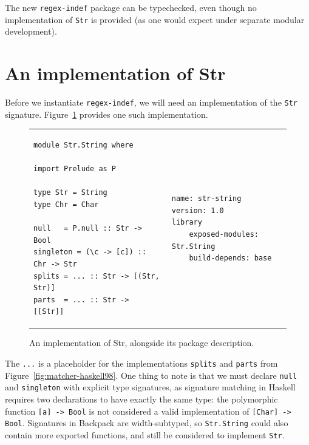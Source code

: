 The new \verb|regex-indef| package can be typechecked, even though no
implementation of \verb|Str| is provided (as one would expect under
separate modular development).

\section{An implementation of Str}

Before we instantiate \verb|regex-indef|, we will need an implementation
of the \verb|Str| signature.  Figure~\ref{fig:matcher-str-string-source}
provides one such implementation.

\begin{figure}
\begin{tabular}{p{} p{}}
\begin{verbatim}
module Str.String where

import Prelude as P

type Str = String
type Chr = Char

null   = P.null :: Str -> Bool
singleton = (\c -> [c]) :: Chr -> Str
splits = ... :: Str -> [(Str, Str)]
parts  = ... :: Str -> [[Str]]
\end{verbatim}
&
\begin{verbatim}
name: str-string
version: 1.0
library
    exposed-modules: Str.String
    build-depends: base
\end{verbatim}
\end{tabular}
\caption{An implementation of Str, alongside its package description.}
\label{fig:matcher-str-string-source}
\end{figure}

The \verb|...| is a placeholder for the implementations \verb|splits|
and \verb|parts| from Figure~\ref{fig:matcher-haskell98}. One thing to
note is that we must declare \verb|null| and \verb|singleton| with
explicit type signatures, as signature matching in Haskell requires two
declarations to have exactly the same type: the polymorphic function
\verb|[a] -> Bool| is not considered a valid implementation of
\verb|[Char] -> Bool|.  Signatures in Backpack are width-subtyped, so
\verb|Str.String| could also contain more exported functions, and still
be considered to implement \verb|Str|.


